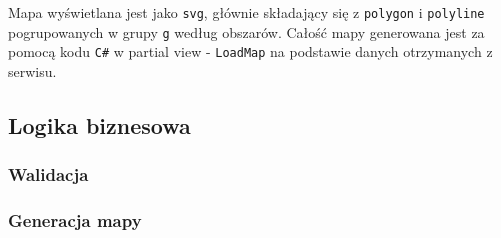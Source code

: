 \documentclass[a4paper, 10pt, titlepage]{article}
\newcommand{\code}[1]{\texttt{#1}}
\begin{document}
Mapa wyświetlana jest jako \code{svg}, głównie składający się z \code{polygon} i \code {polyline} pogrupowanych w grupy \code{g} według obszarów.
Całość mapy generowana jest za pomocą kodu \code{C\#} w partial view - \code{LoadMap} na podstawie danych otrzymanych z serwisu.

\subsection{Logika biznesowa}

\subsubsection{Walidacja}

\subsubsection{Generacja mapy}
\end{document}
